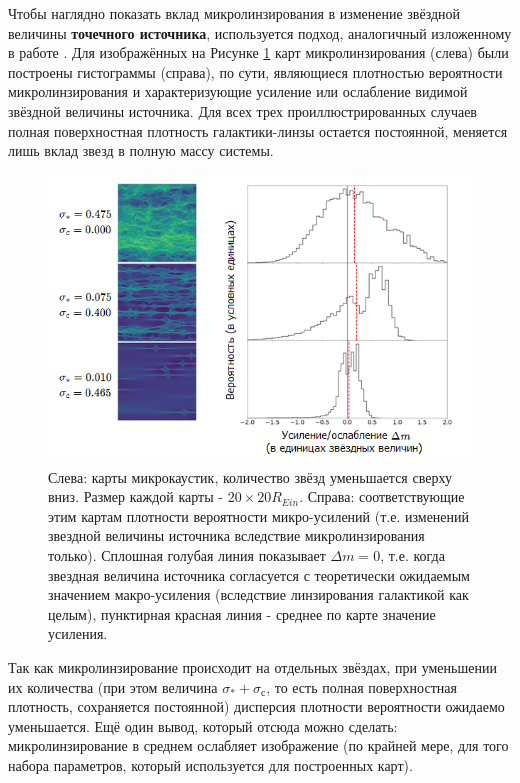 Чтобы наглядно показать вклад микролинзирования в изменение звёздной величины \textbf{точечного источника}, используется подход, аналогичный изложенному в работе \cite{shwamb2002}. Для изображённых на Рисунке \ref{fig:histograms} карт микролинзирования (слева) были построены гистограммы (справа), по сути, являющиеся плотностью вероятности микролинзирования и характеризующие усиление или ослабление видимой звёздной величины источника. Для всех трех проиллюстрированных случаев полная поверхностная плотность галактики-линзы остается постоянной, меняется лишь вклад звезд в полную массу системы.

\begin{figure}[H]
    \centering
	\includegraphics[scale=0.75]{pics/histograms.png}
	\caption{Слева: карты микрокаустик, количество звёзд уменьшается сверху вниз. Размер каждой карты - $20 \times 20 R_{Ein}$. Справа: соответствующие этим картам плотности вероятности микро-усилений (т.е. изменений звездной величины источника вследствие микролинзирования только). Сплошная голубая линия показывает $\Delta m=0$, т.е. когда звездная величина источника согласуется с теоретически ожидаемым значением макро-усиления (вследствие линзирования галактикой как целым), пунктирная красная линия - среднее по карте значение усиления. \label{fig:histograms}} 
\end{figure}

Так как микролинзирование происходит на отдельных звёздах, при уменьшении их количества (при этом величина $\sigma_*+\sigma_с$, то есть полная поверхностная плотность, сохраняется постоянной) дисперсия плотности вероятности ожидаемо уменьшается. Ещё один вывод, который отсюда можно сделать: микролинзирование в среднем ослабляет изображение (по крайней мере, для того набора параметров, который используется для построенных карт). 
